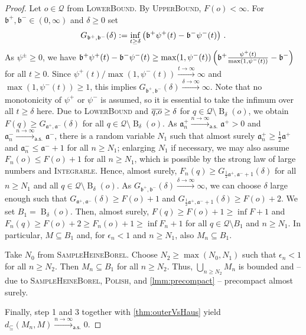 \documentclass{scrartcl}
\renewcommand{\subset}{\subseteq}
\DeclareMathOperator{\ball}{\mathrm{B}}
\newcommand*{\mc}[1]{\mathcal{#1}}
\newcommand*{\ms}[1]{\mathsf{#1}}
\newcommand*{\mf}[1]{\mathfrak{#1}}
\newcommand{\equationFullstop}{\, .}
\newcommand{\eqfs}{\equationFullstop}
\theoremstyle{plain}\newtheorem{theorem}{Theorem}[section]
\theoremstyle{definition}
\theoremstyle{remark}
\begin{document}
\begin{proof}
Let $o\in\mc Q$ from \textsc{LowerBound}. By \textsc{UpperBound}, $F(o) < \infty$. For $\mf b^+, \mf b^- \in(0,\infty)$ and $\delta \geq 0$ set
\begin{equation*}
	G_{\mf b^+, \mf b^-}(\delta)
	:=
	\inf_{t \geq \delta} \br{\mf b^+ \psi^+(t) - \mf b^- \psi^-(t)}
	\eqfs
\end{equation*}
As $\psi^\pm \geq 0$, we have $\mf b^+ \psi^+(t) - \mf b^- \psi^-(t) \geq \max(1,\psi^-(t)) \br{\mf b^+ \frac{\psi^+(t)}{\max(1,\psi^-(t))} - \mf b^-}$ for all $t\geq0$. Since $\psi^+(t)/\max(1, \psi^-(t))\xrightarrow{t\to\infty}\infty$ and $\max(1,\psi^-(t))\geq1$, this implies $G_{\mf b^+, \mf b^-}(\delta) \xrightarrow{\delta\to\infty} \infty$. Note that no monotonicity of $\psi^+$ or $\psi^-$ is assumed, so it is essential to take the infimum over all $t\geq\delta$ here.
Due to \textsc{LowerBound} and $\overline{q,\!o} \geq \delta$ for $q\in\mc Q\setminus\ball_\delta(o)$, we obtain $F(q) \geq G_{\mf a^+, \mf a^-}(\delta)$ for all $q\in\mc Q\setminus \ball_\delta(o)$.
As $\mf a^+_n \xrightarrow{n\to\infty}_{\ms{a.s.}} \mf a^+ > 0$ and $\mf a^-_n \xrightarrow{n\to\infty}_{\ms{a.s.}} \mf a^-$, there is a random variable $N_1$ such that almost surely $\mf a^+_n \geq \frac12 \mf a^+$ and $\mf a^-_n \leq \mf a^- +1$ for all $n\geq N_1$; enlarging $N_1$ if necessary, we may also assume $F_n(o) \leq F(o) + 1$ for all $n \geq N_1$, which is possible by the strong law of large numbers and \textsc{Integrable}. Hence, almost surely, $F_n(q) \geq G_{\frac12\mf a^+, \mf a^-+1}(\delta)$ for all $n\geq N_1$ and all $q\in\mc Q\setminus \ball_\delta(o)$.
As $G_{\mf b^+, \mf b^-}(\delta)\xrightarrow{\delta\to\infty}\infty$, we can choose $\delta$ large enough such that $G_{\mf a^+, \mf a^-}(\delta) \geq F(o) + 1$ and $G_{\frac12\mf a^+, \mf a^-+1}(\delta) \geq F(o) + 2$. We set $B_1 = \ball_\delta(o)$.
Then, almost surely, $F(q) \geq F(o) + 1 \geq \inf F + 1$ and $F_n(q) \geq F(o) + 2 \geq F_n(o) + 1 \geq \inf F_n + 1$ for all $q\in \mc Q \setminus B_1$ and $n \geq N_1$. In particular, $M \subset B_1$ and, for $\epsilon_n < 1$ and $n \geq N_1$, also $M_n \subset B_1$.

\noindent
\underline{}
Take $N_0$ from \textsc{SampleHeineBorel}. Choose $N_2\geq \max(N_0, N_1)$ such that $\epsilon_n < 1$ for all $n \geq N_2$. Then $M_n \subset B_1$ for all $n\geq N_2$. Thus, $\bigcup_{n\geq N_2}M_n$ is bounded and -- due to \textsc{SampleHeineBorel}, \textsc{Polish}, and \autoref{lmm:precompact} -- precompact almost surely. 

\noindent
\underline{}
Finally, step 1 and 3 together with \autoref{thm:outerVsHaus} yield $d_\subset(M_n, M) \xrightarrow{n\to\infty}_{\ms{a.s.}} 0$.
\end{proof}
\end{document}
